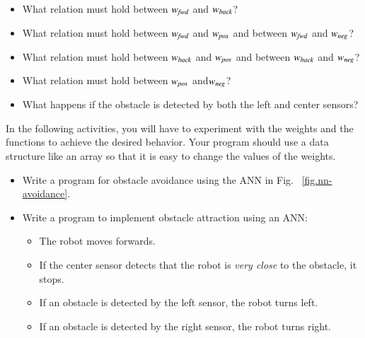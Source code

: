 \begin{framed}
\begin{itemize}
\item What relation must hold between $w_{\textit{\scriptsize fwd}}$ and $w_{\textit{\scriptsize back}}$?
\item What relation must hold between $w_{\textit{\scriptsize fwd}}$ and $w_{\textit{\scriptsize pos}}$ and between $w_{\textit{\scriptsize fwd}}$ and $w_{\textit{\scriptsize neg}}$?
\item What relation must hold between $w_{\textit{\scriptsize back}}$ and $w_{\textit{\scriptsize pos}}$ and between $w_{\textit{\scriptsize back}}$ and $w_{\textit{\scriptsize neg}}$?
\item What relation must hold between $w_{\textit{\scriptsize pos}}$ and$w_{\textit{\scriptsize neg}}$?
\item What happens if the obstacle is detected by both the left and center sensors?
\end{itemize}
\end{framed}

In the following activities, you will have to experiment with the weights and the functions to achieve the desired behavior. Your program should use a data structure like an array so that it is easy to change the values of the weights.

\begin{framed}
\begin{itemize}
\item Write a program for obstacle avoidance using the ANN in Fig.~ \ref{fig.nn-avoidance}.
\end{itemize}
\end{framed}

\begin{framed}
\begin{itemize}
\item Write a program to implement obstacle attraction using an ANN:
\begin{itemize}
\item The robot moves forwards.
\item If the center sensor detects that the robot is \emph{very close} to the obstacle, it stops.
\item If an obstacle is detected by the left sensor, the robot turns left.
\item If an obstacle is detected by the right sensor, the robot turns right.
\end{itemize}
\end{itemize}
\end{framed}


